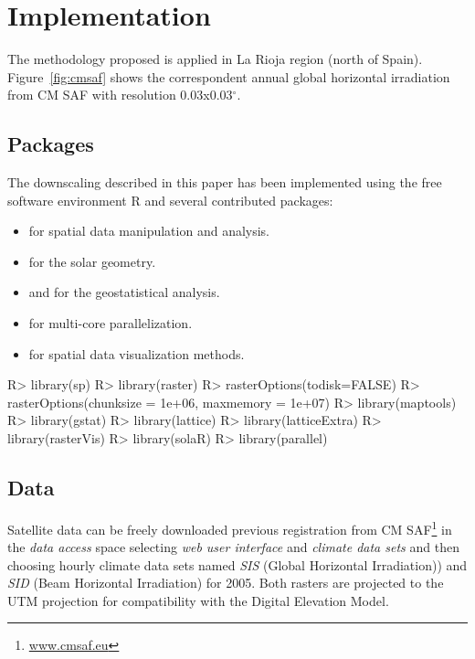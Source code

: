 \documentclass[article]{jss}
\begin{document}
\section{Implementation}
\label{sec-1}


The methodology proposed is applied in La Rioja region (north of
Spain). Figure~\ref{fig:cmsaf} shows the correspondent annual
global horizontal irradiation from CM SAF with resolution
0.03x0.03$^\circ$. 

\subsection{Packages}
\label{sec-1-1}

The downscaling described in this paper has been implemented using
the free software environment R \citep{proglangRDevelopmentCoreTeam2013}
and several contributed packages:

\begin{itemize}
\item {} \citep{Hijmans.Etten2013} for spatial data manipulation
  and analysis.
\item {} \citep{Perpinan-Lamigueiro2012} for the solar
  geometry.
\item {} \citep{Pebesma.Graeler2013} and 
  \citep{Pebesma.Bivand.ea2013} for the geostatistical analysis.
\item {} for multi-core parallelization.
\item {} \citep{Perpinan-Lamiguiero.Hijmans2013} for spatial data
  visualization methods.
\end{itemize}

\begin{CodeChunk}
\begin{CodeInput}
R> library(sp)
R> library(raster)
R> rasterOptions(todisk=FALSE)
R> rasterOptions(chunksize = 1e+06, maxmemory = 1e+07)
R> library(maptools)
R> library(gstat)
R> library(lattice)
R> library(latticeExtra)
R> library(rasterVis)
R> library(solaR)
R> library(parallel)
\end{CodeInput}
\end{CodeChunk}


\subsection{Data}
\label{sec-1-2}

Satellite data can be freely downloaded previous registration from CM
SAF\footnote{\url{www.cmsaf.eu}} in the \emph{data access} space selecting \emph{web user interface} and \emph{climate data sets} and then choosing
hourly climate data sets named \emph{SIS} (Global Horizontal
Irradiation)) and \emph{SID} (Beam Horizontal Irradiation) for
2005. Both rasters are projected to the UTM projection for
compatibility with the Digital Elevation Model.
\end{document}
